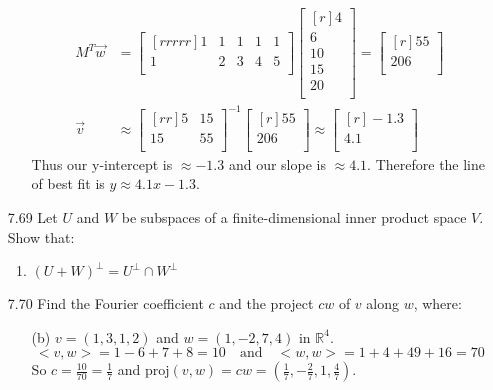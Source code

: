 \documentclass[12pt]{article}
\theoremstyle{definition}
\theoremstyle{plain}
\begin{document}
\begin{enumerate}
\begin{enumerate}
\begin{align*}
		M^T\vec{w}&=\begin{bmatrix}[rrrrr]1&1&1&1&1\\1&2&3&4&5\\\end{bmatrix}\begin{bmatrix}[r]4\\6\\10\\15\\20\\\end{bmatrix} = \begin{bmatrix}[r]55\\206\\\end{bmatrix}\\
		\vec{v}&\approx \begin{bmatrix}[rr]5&15\\15&55\\\end{bmatrix}^{-1}\begin{bmatrix}[r]55\\206\\\end{bmatrix} \approx \begin{bmatrix}[r]-1.3\\4.1\\\end{bmatrix}
		\end{align*}
		Thus our y-intercept is $\approx -1.3$ and our slope is $\approx 4.1$. Therefore the line of best fit is $y \approx 4.1x-1.3$.
	\end{enumerate}

\item[7.69]Let $U$ and $W$ be subspaces of a finite-dimensional inner product space $V$. Show that:
	\begin{enumerate}
	\item $(U+W)^\perp = U^\perp \cap W^\perp$
	\end{enumerate}

\item[7.70]Find the Fourier coefficient $c$ and the project $cw$ of $v$ along $w$, where:
	\begin{enumerate}
	\item[(b)] $v=(1,3,1,2)$ and $w=(1,-2,7,4)$ in $\mathbb{R}^4$.
		\[ <v,w>=1-6+7+8=10 \quad \mathrm{and} \quad <w,w>=1+4+49+16=70 \]
		So $c=\frac{10}{70}=\frac{1}{7}$ and $\mathrm{proj}(v,w)=cw=(\frac{1}{7},-\frac{2}{7},1,\frac{4}{7})$.
	\end{enumerate}


\end{enumerate}
\end{document}
